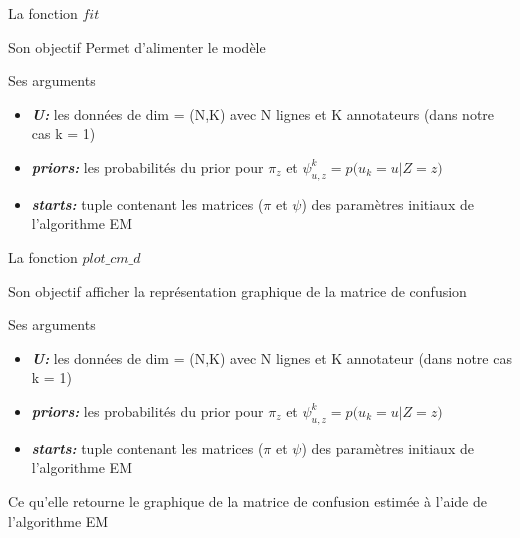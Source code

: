 \documentclass[11pt]{beamer}
\begin{document}
	\begin{frame}{La fonction $fit$}
		\begin{block}{Son objectif}
			Permet d'alimenter le modèle
		\end{block}
		\begin{block}{Ses arguments}
			\begin{itemize}
				\item \textbf{\textit{U:}} les données de dim = (N,K) avec N lignes et K annotateurs (dans notre cas k = 1) \\
				\item \textbf{\textit{priors:}} les probabilités du prior pour $\pi_z$ et $\psi_{u,z}^k = p\big(u_k = u | Z = z\big)$ \\
				\item \textbf{\textit{starts:}} tuple contenant les matrices ($\pi$ et $\psi$) des paramètres initiaux de l'algorithme EM
			\end{itemize}
		\end{block}
	\end{frame}
	\begin{frame}{La fonction $ plot\_cm\_d$}
		\scriptsize
		\begin{block}{Son objectif}
			 afficher la représentation graphique de la matrice de confusion
		\end{block}
		\begin{block}{Ses arguments}
			\begin{itemize}
				\item \textbf{\textit{U:}} les données de dim = (N,K) avec N lignes et K annotateur (dans notre cas k = 1) \\
				\item \textbf{\textit{priors:}} les probabilités du prior pour $\pi_z$ et $\psi_{u,z}^k = p\big(u_k = u | Z = z\big)$ \\
				\item \textbf{\textit{starts:}} tuple contenant les matrices ($\pi$ et $\psi$) des paramètres initiaux de l'algorithme EM
			\end{itemize}
		\end{block}
		\begin{block}{Ce qu'elle retourne}
			le graphique de la matrice de confusion estimée à l'aide de l'algorithme EM
		\end{block}
	\end{frame}
\end{document}
